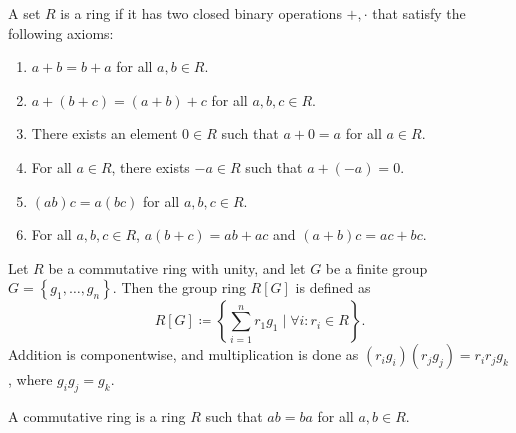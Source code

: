 \begin{definition}[Ring]\label{dfn:Ring}
	A set $R$ is a ring if it has two closed binary operations $+,\cdot $ that satisfy the following axioms:
	\begin{enumerate}
		\item $a+b=b+a$ for all $a,b\in R$.
		\item $a+(b+c)=(a+b)+c$ for all $a,b,c\in R$.
		\item There exists an element $0\in R$ such that $a+0=a$ for all $a\in R$.
		\item For all $a\in R$, there exists $-a\in R$ such that $a+(-a)=0$.
		\item $(ab)c=a(bc)$ for all $a,b,c\in R$.
		\item For all $a,b,c\in R$, $a(b+c)=ab+ac$ and $(a+b)c=ac+bc$.
	\end{enumerate}
\end{definition}
\begin{definition}\label{dfn:gr}
	Let $R$ be a commutative ring with unity, and let $G$ be a finite group $G=\left\{ g_1, \dots, g_n  \right\} $. Then the group ring $R[G]$ is defined as
	\[
		R[G]\coloneqq \left\{ \sum_{i=1}^{n} r_1g_1 \mid \forall i: r_i\in R \right\}
	.\]
	Addition is componentwise, and multiplication is done  as $(r_ig_i)(r_jg_j)=r_ir_jg_k$, where $g_ig_j=g_k$.
\end{definition}
\begin{definition}\label{dfn:cr}
	A commutative ring is a ring $R$ such that $ab=ba$ for all $a,b\in R$.
\end{definition}
